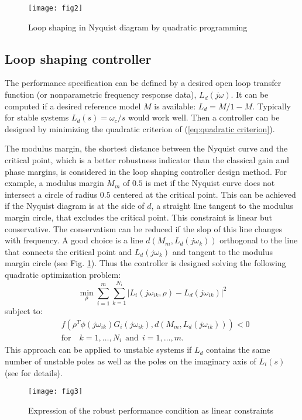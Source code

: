 \documentclass [12pt , a4paper] {article}
\begin{document}
\begin{figure}
\centering
\texttt{[image: fig2]}
\caption{Loop shaping in Nyquist diagram by quadratic programming}
\label{fig:LS}
\end{figure}

\subsection{Loop shaping controller}
The performance specification can be defined by a desired open loop transfer function (or nonparametric frequency response data), $L_d(j\omega)$. It can be computed if a desired reference model $M$ is available: $L_d=M/1-M$. Typically for stable systems $L_d(s)=\omega_c/s$ would work well. Then a controller can be designed by minimizing the quadratic criterion of (\ref{eq:quadratic criterion}).

The modulus margin, the shortest distance between the Nyquist curve and the critical point, which is a better robustness indicator than the classical gain and phase margins, is considered in the loop shaping controller design method. For example, a modulus margin $M_m$ of $0.5$ is met if the Nyquist curve does not intersect a circle of radius $0.5$ centered at the critical point. This can be achieved if the Nyquist diagram is at the side of $d$, a straight line tangent to the modulus margin circle, that excludes the critical point. This constraint is linear but conservative. The conservatism can be reduced if the slop of this line changes with frequency. A good choice is a line $d(M_m,L_d(j\omega_k))$ orthogonal to the line that connects the critical point and $L_d(j\omega_k)$ and tangent to the modulus margin circle (see Fig. \ref{fig:LS}). Thus the controller is designed solving the following quadratic optimization problem:
\[
\min_\rho{\sum_{i=1}^{m}\sum_{k=1}^{N_i} |L_i(j\omega_{ik},\rho)-L_d(j\omega_{ik})|^2}
\]
subject to:
\begin{align}
\label{eq:opLS}
& f(\rho^T \phi(j\omega_{ik})G_i(j\omega_{ik}),d(M_m,L_d(j\omega_{ik})))<0 \\
& \mbox{for} \quad  k=1,\ldots,N_i \:\: \mbox{and} \:\: i=1,\ldots,m. \nonumber
\end{align}
This approach can be applied to unstable systems if $L_d$ contains the same number of unstable poles as well as the poles  on the imaginary axis of $L_i(s)$ (see \cite{KG10} for details).

\begin{figure}
\centering
\texttt{[image: fig3]}
\caption{Expression of the robust performance condition as linear constraints}
\label{fig:Hinf}
\end{figure}
\end{document}
